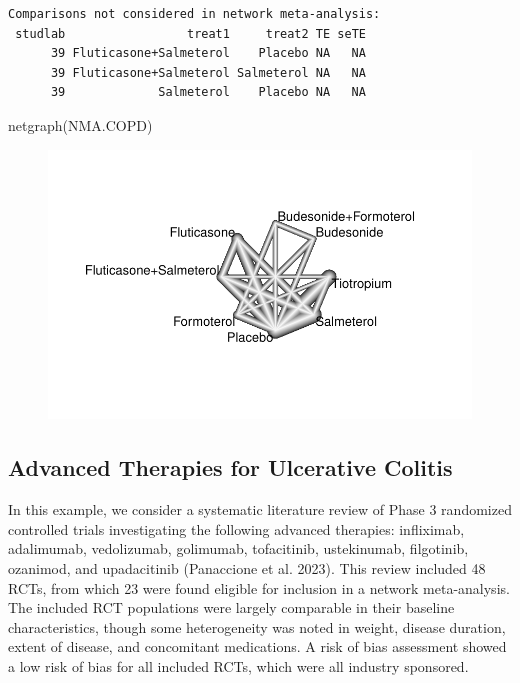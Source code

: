 \documentclass[
  letterpaper,
  DIV=11,
  numbers=noendperiod]{scrreprt}
\newenvironment{Shaded}{\begin{snugshade}}{\end{snugshade}}
\newcommand{\FunctionTok}[1]{\textcolor[rgb]{0.28,0.35,0.67}{#1}}
\newcommand{\NormalTok}[1]{\textcolor[rgb]{0.00,0.23,0.31}{#1}}
\begin{document}
\begin{verbatim}
Comparisons not considered in network meta-analysis:
 studlab                 treat1     treat2 TE seTE
      39 Fluticasone+Salmeterol    Placebo NA   NA
      39 Fluticasone+Salmeterol Salmeterol NA   NA
      39             Salmeterol    Placebo NA   NA
\end{verbatim}

\begin{Shaded}
\begin{Highlighting}[]
\FunctionTok{netgraph}\NormalTok{(NMA.COPD)}
\end{Highlighting}
\end{Shaded}

\begin{figure}[H]

{\centering \includegraphics{chapter_10_files/figure-pdf/unnamed-chunk-23-1.pdf}

}

\end{figure}

\hypertarget{advanced-therapies-for-ulcerative-colitis}{%
\subsection{Advanced Therapies for Ulcerative
Colitis}\label{advanced-therapies-for-ulcerative-colitis}}

In this example, we consider a systematic literature review of Phase 3
randomized controlled trials investigating the following advanced
therapies: infliximab, adalimumab, vedolizumab, golimumab, tofacitinib,
ustekinumab, filgotinib, ozanimod, and upadacitinib (Panaccione et al.
2023). This review included 48 RCTs, from which 23 were found eligible
for inclusion in a network meta-analysis. The included RCT populations
were largely comparable in their baseline characteristics, though some
heterogeneity was noted in weight, disease duration, extent of disease,
and concomitant medications. A risk of bias assessment showed a low risk
of bias for all included RCTs, which were all industry sponsored.
\end{document}
